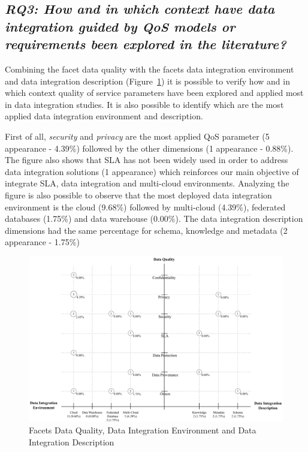 \subsection{\textit{RQ3: How and in which context have data integration guided
by QoS models or requirements been explored in the literature?}}

Combining the facet data quality with the facets data integration environment and data integration description
(Figure~\ref{fig:facet4}) it is possible to verify how and in which context
quality of service parameters have been explored and applied most in data
integration studies. It is also possible to identify which are the most applied
data integration environment and description.

First of all, \textit{security} and \textit{privacy} are the most applied QoS
parameter (5 appearance - 4.39\%) followed by the other dimensions (1 appearance - 0.88\%). 
The figure also shows that SLA has not been widely used in order to address data integration solutions
(1 appearance) which reinforces our main objective of integrate SLA, data integration and multi-cloud 
environments. 
Analyzing the figure is also possible to observe that the most deployed data integration environment is 
the cloud (9.68\%) followed by multi-cloud (4.39\%), federated databases (1.75\%) and data warehouse (0.00\%).
The data integration description dimensions had the same percentage for schema, knowledge and metadata (2 appearance - 1.75\%)

\begin{figure}[!h]
\centering
\includegraphics[scale=0.53]{figs/bubble-charts/Data-Quality-DI.pdf}
\caption{Facets Data Quality, Data Integration Environment and Data Integration Description}\label{fig:facet4}
\end{figure}
% 
